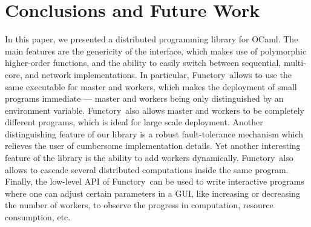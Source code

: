 \documentclass{llncs}
\newcommand{\Ocaml}{OCaml}
\newcommand{\functory}{\textsf{Functory}}
\begin{document}
\section{Conclusions and Future Work}\label{sec:future}

In this paper, we presented a distributed programming library for
\Ocaml. The main features are the
genericity of the interface, which makes use of polymorphic
higher-order functions, and the ability to easily switch between
sequential, multi-core, and network implementations. In particular,
\functory\ allows to use the same executable for master and workers,
which makes the deployment of small programs immediate --- master and
workers being only distinguished by an environment
variable. \functory\ also allows master and workers to be completely
different programs, which is ideal for large scale deployment.
Another distinguishing feature of our library is a robust
fault-tolerance mechanism which relieves the user of cumbersome
implementation details.  Yet another interesting feature of the
library is the ability to add workers dynamically. \functory\
also allows to cascade several distributed computations inside the
same program.  Finally, the low-level API of \functory\ 
can be used to write interactive programs where one can adjust certain
parameters in a GUI, like increasing or decreasing the number of
workers, to observe the progress in computation, resource consumption, etc.
\end{document}
